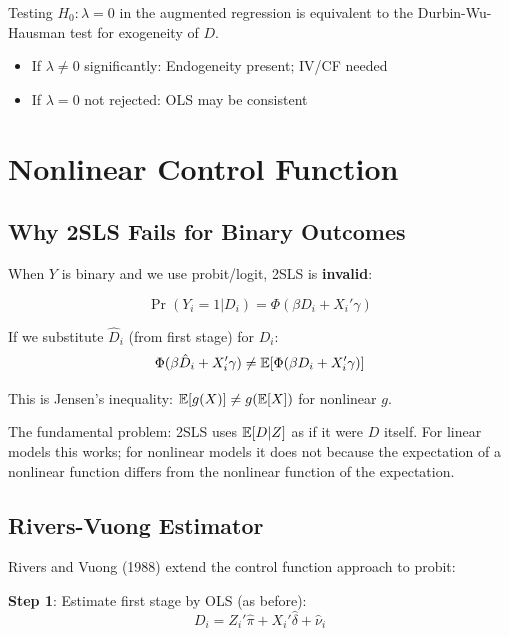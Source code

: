 \begin{proposition}
\label{prop:cf_hausman}
Testing $H_0: \lambda = 0$ in the augmented regression is equivalent to the Durbin-Wu-Hausman test for exogeneity of $D$.
\end{proposition}

\begin{itemize}
    \item If $\lambda \neq 0$ significantly: Endogeneity present; IV/CF needed
    \item If $\lambda = 0$ not rejected: OLS may be consistent
\end{itemize}


\section{Nonlinear Control Function}
\label{sec:cf_nonlinear}

\subsection{Why 2SLS Fails for Binary Outcomes}

When $Y$ is binary and we use probit/logit, 2SLS is \textbf{invalid}:

\begin{equation}
\Pr(Y_i = 1 | D_i) = \Phi(\beta D_i + X_i'\gamma)
\end{equation}

If we substitute $\hat{D}_i$ (from first stage) for $D_i$:
\[
\Phi(\beta \hat{D}_i + X_i'\gamma) \neq \mathbb{E}[\Phi(\beta D_i + X_i'\gamma)]
\]

This is Jensen's inequality: $\mathbb{E}[g(X)] \neq g(\mathbb{E}[X])$ for nonlinear $g$.

\begin{insight}
The fundamental problem: 2SLS uses $\mathbb{E}[D|Z]$ as if it were $D$ itself. For linear models this works; for nonlinear models it does not because the expectation of a nonlinear function differs from the nonlinear function of the expectation.
\end{insight}

\subsection{Rivers-Vuong Estimator}

Rivers and Vuong (1988) extend the control function approach to probit:

\textbf{Step 1}: Estimate first stage by OLS (as before):
\[
D_i = Z_i'\hat{\pi} + X_i'\hat{\delta} + \hat{\nu}_i
\]

